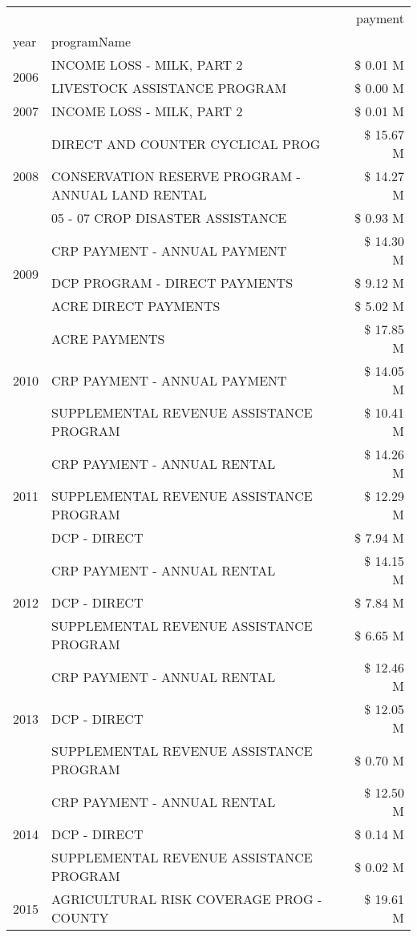 \begin{tabular}{llr}
\toprule
 &  & payment \\
year & programName &  \\
\midrule
\multirow[t]{2}{*}{2006} & INCOME LOSS - MILK, PART 2 & \$ 0.01 M \\
 & LIVESTOCK ASSISTANCE PROGRAM & \$ 0.00 M \\
\cline{1-3}
2007 & INCOME LOSS - MILK, PART 2 & \$ 0.01 M \\
\cline{1-3}
\multirow[t]{3}{*}{2008} & DIRECT AND COUNTER CYCLICAL PROG & \$ 15.67 M \\
 & CONSERVATION RESERVE PROGRAM - ANNUAL LAND RENTAL & \$ 14.27 M \\
 & 05 - 07 CROP DISASTER ASSISTANCE & \$ 0.93 M \\
\cline{1-3}
\multirow[t]{3}{*}{2009} & CRP PAYMENT - ANNUAL PAYMENT & \$ 14.30 M \\
 & DCP PROGRAM - DIRECT PAYMENTS & \$ 9.12 M \\
 & ACRE DIRECT PAYMENTS & \$ 5.02 M \\
\cline{1-3}
\multirow[t]{3}{*}{2010} & ACRE PAYMENTS & \$ 17.85 M \\
 & CRP PAYMENT - ANNUAL PAYMENT & \$ 14.05 M \\
 & SUPPLEMENTAL REVENUE ASSISTANCE PROGRAM & \$ 10.41 M \\
\cline{1-3}
\multirow[t]{3}{*}{2011} & CRP PAYMENT - ANNUAL RENTAL & \$ 14.26 M \\
 & SUPPLEMENTAL REVENUE ASSISTANCE PROGRAM & \$ 12.29 M \\
 & DCP - DIRECT & \$ 7.94 M \\
\cline{1-3}
\multirow[t]{3}{*}{2012} & CRP PAYMENT - ANNUAL RENTAL & \$ 14.15 M \\
 & DCP - DIRECT & \$ 7.84 M \\
 & SUPPLEMENTAL REVENUE ASSISTANCE PROGRAM & \$ 6.65 M \\
\cline{1-3}
\multirow[t]{3}{*}{2013} & CRP PAYMENT - ANNUAL RENTAL & \$ 12.46 M \\
 & DCP - DIRECT & \$ 12.05 M \\
 & SUPPLEMENTAL REVENUE ASSISTANCE PROGRAM & \$ 0.70 M \\
\cline{1-3}
\multirow[t]{3}{*}{2014} & CRP PAYMENT - ANNUAL RENTAL & \$ 12.50 M \\
 & DCP - DIRECT & \$ 0.14 M \\
 & SUPPLEMENTAL REVENUE ASSISTANCE PROGRAM & \$ 0.02 M \\
\cline{1-3}
\multirow[t]{3}{*}{2015} & AGRICULTURAL RISK COVERAGE PROG - COUNTY & \$ 19.61 M \\

\end{tabular}
